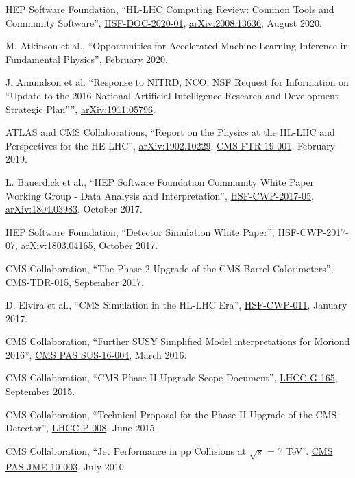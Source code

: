 \begin{nbdescription}[leftmargin=12pt,font=\normalfont,labelsep=0em]
\item HEP Software Foundation, ``HL-LHC Computing Review: Common Tools and Community Software'', \href{https://dx.doi.org/10.5281/zenodo.4009114}{HSF-DOC-2020-01}, \href{https://arxiv.org/abs/2008.13636}{arXiv:2008.13636}, August 2020. %
\item M. Atkinson et al., ``Opportunities for Accelerated Machine Learning Inference in Fundamental Physics'', \href{https://fastmachinelearning.org/images/coproc_whitepaper_v0.pdf}{February 2020}.
\item J. Amundson et al. ``Response to NITRD, NCO, NSF Request for Information on ``Update to the 2016 National Artificial Intelligence Research and Development Strategic Plan'''', \href{https://arxiv.org/abs/1911.05796}{arXiv:1911.05796}. %
\item \begin{sloppypar}ATLAS and CMS Collaborations, ``Report on the Physics at the HL-LHC and Perspectives for the HE-LHC'', \href{http://arxiv.org/abs/arXiv:1902.10229}{arXiv:1902.10229}, \href{https://cds.cern.ch/record/2651134}{CMS-FTR-19-001}, February 2019.\end{sloppypar} %
\item L. Bauerdick et al., ``HEP Software Foundation Community White Paper Working Group - Data Analysis and Interpretation'', \href{http://hepsoftwarefoundation.org/activities/cwp.html}{HSF-CWP-2017-05}, \href{https://arxiv.org/abs/1804.03983}{arXiv:1804.03983}, October 2017. %
\item HEP Software Foundation, ``Detector Simulation White Paper'', \href{http://hepsoftwarefoundation.org/activities/cwp.html}{HSF-CWP-2017-07}, \href{https://arxiv.org/abs/1803.04165}{arXiv:1803.04165}, October 2017. %
\item CMS Collaboration, ``The Phase-2 Upgrade of the CMS Barrel Calorimeters'', \href{https://cds.cern.ch/record/2283187}{CMS-TDR-015}, September 2017.
\item D. Elvira et al., ``CMS Simulation in the HL-LHC Era'', \href{http://hepsoftwarefoundation.org/cwp-whitepapers.html}{HSF-CWP-011}, January 2017.
\item CMS Collaboration, ``Further SUSY Simplified Model interpretations for Moriond 2016'', \href{http://cds.cern.ch/record/2140312}{CMS PAS SUS-16-004}, March 2016. %
\item CMS Collaboration, ``CMS Phase II Upgrade Scope Document'', \href{https://cds.cern.ch/record/2055167}{LHCC-G-165}, September 2015.
\item CMS Collaboration, ``Technical Proposal for the Phase-II Upgrade of the CMS Detector'', \href{http://cds.cern.ch/record/2020886}{LHCC-P-008}, June 2015. %
\item CMS Collaboration, ``Jet Performance in pp Collisions at $\sqrt{s}$ = 7 TeV''. \href{http://cds.cern.ch/record/1279362}{CMS PAS JME-10-003}, July 2010. %
\end{nbdescription}

